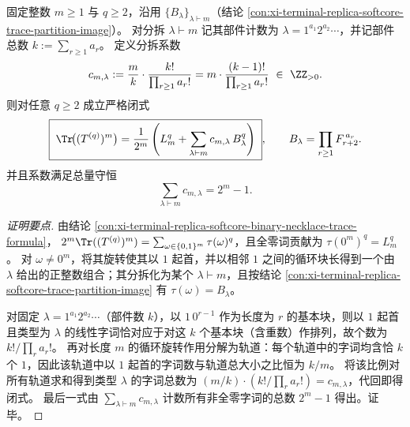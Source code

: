 \begin{conclusion}\label{con:xi-terminal-replica-softcore-partition-trace-closed-form}
固定整数 \(m\ge 1\) 与 \(q\ge 2\)，沿用 \(\{B_\lambda\}_{\lambda\vdash m}\)（结论 \ref{con:xi-terminal-replica-softcore-trace-partition-image}）。
对分拆 \(\lambda\vdash m\) 记其部件计数为 \(\lambda=1^{a_1}2^{a_2}\cdots\)，并记部件总数 \(k:=\sum_{r\ge1}a_r\)。
定义分拆系数
\[
c_{m,\lambda}:=\frac{m}{k}\cdot\frac{k!}{\prod_{r\ge1}a_r!}
= m\cdot\frac{(k-1)!}{\prod_{r\ge1}a_r!}\ \in\ \ZZ_{>0}.
\]
则对任意 \(q\ge 2\) 成立严格闭式
\[
\boxed{\;
\Tr\!\bigl((T^{(q)})^m\bigr)
=\frac1{2^m}\left(L_m^{q}+\sum_{\lambda\vdash m}c_{m,\lambda}\,B_\lambda^{q}\right)\; } ,
\qquad
B_\lambda=\prod_{r\ge1}F_{r+2}^{\,a_r}.
\]
并且系数满足总量守恒
\[
\sum_{\lambda\vdash m}c_{m,\lambda}=2^m-1.
\]
\end{conclusion}
\begin{proof}[证明要点]
由结论 \ref{con:xi-terminal-replica-softcore-binary-necklace-trace-formula}，
\(
2^{m}\Tr((T^{(q)})^m)=\sum_{\omega\in\{0,1\}^m}\tau(\omega)^q
\)，且全零词贡献为 \(\tau(0^m)^q=L_m^q\)。
对 \(\omega\neq 0^m\)，将其旋转使其以 \(1\) 起首，并以相邻 \(1\) 之间的循环块长得到一个由 \(\lambda\) 给出的正整数组合；其分拆化为某个 \(\lambda\vdash m\)，且按结论 \ref{con:xi-terminal-replica-softcore-trace-partition-image} 有 \(\tau(\omega)=B_\lambda\)。
\par
对固定 \(\lambda=1^{a_1}2^{a_2}\cdots\)（部件数 \(k\)），以 \(1\,0^{r-1}\) 作为长度为 \(r\) 的基本块，则以 \(1\) 起首且类型为 \(\lambda\) 的线性字词恰对应于对这 \(k\) 个基本块（含重数）作排列，故个数为 \(k!/\prod_r a_r!\)。
再对长度 \(m\) 的循环旋转作用分解为轨道：每个轨道中的字词均含恰 \(k\) 个 \(1\)，因此该轨道中以 \(1\) 起首的字词数与轨道总大小之比恒为 \(k/m\)。
将该比例对所有轨道求和得到类型 \(\lambda\) 的字词总数为 \((m/k)\cdot(k!/\prod_r a_r!)=c_{m,\lambda}\)，代回即得闭式。
最后一式由 \(\sum_{\lambda\vdash m}c_{m,\lambda}\) 计数所有非全零字词的总数 \(2^m-1\) 得出。证毕。
\end{proof}





